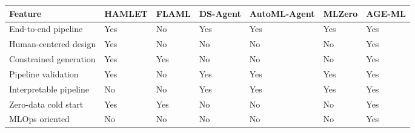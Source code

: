 \begin{tabular}{lllllll}
\hline
Feature & HAMLET & FLAML & DS-Agent & AutoML-Agent & MLZero & AGE-ML \\
\hline
End-to-end pipeline & Yes & No & Yes & Yes & Yes & Yes \\
Human-centered design & Yes & No & No & No & No & Yes \\
Constrained generation & Yes & Yes & No & No & No & Yes \\
Pipeline validation & Yes & No & Yes & Yes & Yes & Yes \\
Interpretable pipeline & No & No & Yes & Yes & Yes & Yes \\
Zero-data cold start & Yes & Yes & No & No & No & Yes \\
MLOps oriented & No & No & No & No & No & Yes \\
\hline
\end{tabular}
